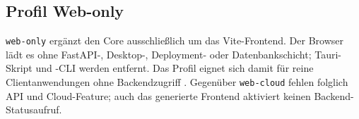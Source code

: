 \subsection{Profil Web-only}
\label{subsec:profil-web-only}

\texttt{web-only} ergänzt den Core ausschließlich um das Vite-Frontend. Der
Browser lädt es ohne FastAPI-, Desktop-, Deployment- oder Datenbankschicht;
Tauri-Skript und -CLI werden entfernt. Das Profil eignet sich damit für reine
Clientanwendungen ohne Backendzugriff \parencite{kleiveist2026profiles}.
Gegenüber \texttt{web-cloud} fehlen folglich API und Cloud-Feature; auch das
generierte Frontend aktiviert keinen Backend-Statusaufruf.
